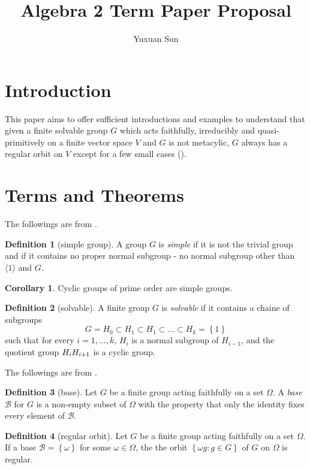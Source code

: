 \documentclass[a4paper]{article}
\title{Algebra 2 Term Paper Proposal}
\author{Yuxuan Sun}
\theoremstyle{definition}
\newtheorem{definition}{Definition}
\newtheorem{corollary}{Corollary}
\begin{document}
	
\maketitle

\section{Introduction}
This paper aims to offer sufficient introductions and examples to understand that given a finite solvable group $G$ which acts faithfully, irreducibly and quasi-primitively on a finite vector space $V$ and $G$ is not metacylic, $G$ always has a regular orbit on  $V$ except for a few small cases (\citep{yang_regular_2020}).


\section{Terms and Theorems}

The followings are from \citep{artinAlgebra}.

\begin{definition}[simple group]
	A group $G$ is \textit{simple} if it is not the trivial group and if it contains no proper normal subgroup - no normal subgroup other than  $\langle 1 \rangle $ and $G$.	
\end{definition}

\begin{corollary}
	Cyclic groups of prime order are simple groups.
\end{corollary}

\begin{definition}[solvable]
	A finite group $G$ is \textit{solvable} if it contains a chaine of subgroups \[
	G = H_0 \subset H_1 \subset H_1 \subset \ldots \subset  H_k = \left\{ 1 \right\}  
	\]  such that for every $i = 1, \ldots, k$, $H_i$ is a normal subgroup of $H_{i-1}$, and the quotient group $H_i\/H_{i+1}$ is a cyclic group.
\end{definition}

The followings are from \citep{fawcett_regular_2016}.

\begin{definition}[base]
	Let $G$ be a finite group acting faithfully on a set  $\Omega$. A \textit{base}  $\mathscr{B}$ for  $G$ is a non-empty subset of  $\Omega$ with the property that only the identity fixes every element of  $\mathscr{B}$.
\end{definition}

\begin{definition}[regular orbit]
	Let $G$ be a finite group acting faithfully on a set  $\Omega$. If a base $\mathscr{B} = \left\{ \omega \right\} $ for some $\omega \in \Omega$, the the orbit $\left\{ \omega g : g \in  G \right\} $ of $G$ on  $\Omega$ is regular. 
\end{definition}
\end{document}
